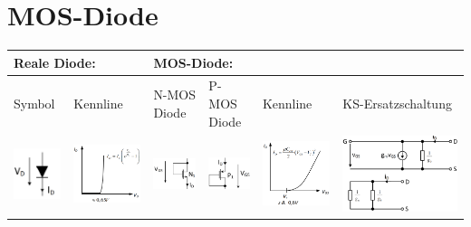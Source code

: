 \section{MOS-Diode}
\begin{tabular}{|l|l|l|l|l|l|}
    \hline
    \multicolumn{2}{|l|}{\textbf{Reale Diode:}} & \multicolumn{4}{l|}{\textbf{MOS-Diode:}} \\
    \hline
    Symbol      & Kennline      & N-MOS Diode       & P-MOS Diode       & Kennline      & KS-Ersatzschaltung \\
    \includegraphics[width=0.11\linewidth]{Reale Diode.png} & \includegraphics[width=0.14\linewidth]{Reale Diode_Kennline.png} &
    \includegraphics[width=0.13\linewidth]{N-MOS Diode.png} & \includegraphics[width=0.13\linewidth]{P-MOS Diode.png} & \includegraphics[width=0.14\linewidth]{MOS-Diode_Kennline.png} & \includegraphics[width=0.2\linewidth]{MOS-Diode_KS.png} \\
    \hline
\end{tabular}\vspace{5pt}\\
\renewcommand{\arraystretch}{1.2}
